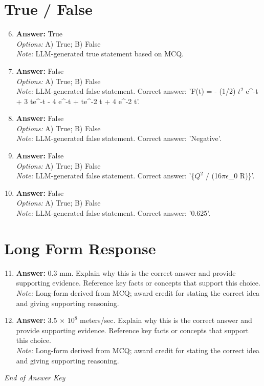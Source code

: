 \documentclass[12pt]{article}
\begin{document}
\section*{True / False}
\begin{enumerate}[label=\arabic*.]
\setcounter{enumi}{5}
\item \textbf{Answer:} True
\\ \textit{Options:} A) True; B) False
\\ \textit{Note:} LLM-generated true statement based on MCQ.
\item \textbf{Answer:} False
\\ \textit{Options:} A) True; B) False
\\ \textit{Note:} LLM-generated false statement. Correct answer: 'F(t) = - (1/2) $t^2$ e^-t + 3 te^-t - 4 e^-t + te^-2 t + 4 e^-2 t'.
\item \textbf{Answer:} False
\\ \textit{Options:} A) True; B) False
\\ \textit{Note:} LLM-generated false statement. Correct answer: 'Negative'.
\item \textbf{Answer:} False
\\ \textit{Options:} A) True; B) False
\\ \textit{Note:} LLM-generated false statement. Correct answer: '\{$Q^2$ / (16\ensuremath{\pi}\ensuremath{\epsilon}\_0 R)\}'.
\item \textbf{Answer:} False
\\ \textit{Options:} A) True; B) False
\\ \textit{Note:} LLM-generated false statement. Correct answer: '0.625'.
\end{enumerate}

\section*{Long Form Response}
\begin{enumerate}[label=\arabic*.]
\setcounter{enumi}{10}
\item \textbf{Answer:} 0.3 mm. Explain why this is the correct answer and provide supporting evidence. Reference key facts or concepts that support this choice.
\\ \textit{Note:} Long-form derived from MCQ; award credit for stating the correct idea and giving supporting reasoning.
\item \textbf{Answer:} 3.5 \ensuremath{\times} $10^8$ meters/sec. Explain why this is the correct answer and provide supporting evidence. Reference key facts or concepts that support this choice.
\\ \textit{Note:} Long-form derived from MCQ; award credit for stating the correct idea and giving supporting reasoning.
\end{enumerate}

\vfill
\noindent\textit{End of Answer Key}
\end{document}
